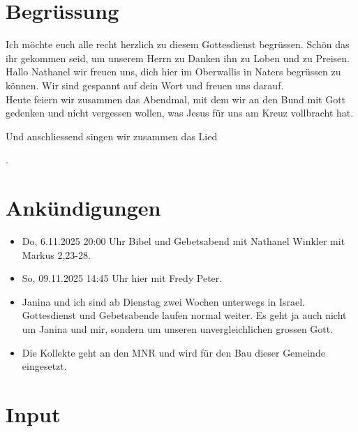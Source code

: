 \documentclass{../../inc/mybib}
\begin{document}
\section{Begrüssung}

Ich möchte euch alle recht herzlich zu diesem Gottesdienst begrüssen. Schön das ihr gekommen seid, um unserem Herrn zu Danken ihn zu Loben und zu Preisen.
Hallo Nathanel wir freuen uns, dich hier im Oberwallis in Naters begrüssen zu können. Wir sind gespannt auf dein Wort und freuen uns darauf.\\
Heute feiern wir zusammen das Abendmal, mit dem wir an den Bund mit Gott gedenken und nicht vergessen wollen, was Jesus für uns am Kreuz vollbracht hat.

\beten{} Und anschliessend singen wir zusammen das Lied

{}.

\section{Ankündigungen}
\begin{itemize}
    \item {} Do, 6.11.2025 20:00 Uhr Bibel und Gebetsabend mit Nathanel Winkler mit Markus 2,23-28.
    \item {} So, 09.11.2025 14:45 Uhr hier mit Fredy Peter.
    \item {} Janina und ich sind ab Dienstag zwei Wochen unterwegs in Israel. Gottesdienst und Gebetsabende laufen normal weiter. Es geht ja auch nicht um Janina und mir, sondern um unseren unvergleichlichen grossen Gott. 
    \item {} Die Kollekte geht an den MNR und wird für den Bau dieser Gemeinde eingesetzt.
\end{itemize}

\section{ Input }
\begin{spacing}{1.5}
    \begin{block}[Paradies]
    \end{block}
    \begin{block}
    \end{block}
    \begin{block}
    \end{block}
    \begin{block}
    \end{block}
    \begin{block}
    \end{block}
    \begin{block}
    \end{block}

\end{spacing}
\end{document}
